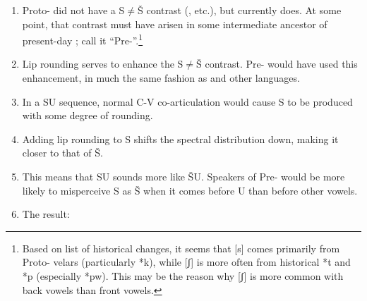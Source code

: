 \documentclass[output=paper,newtxmath,modfonts,nonflat,hidelinks]{langsci/langscibook}
\begin{document}
\begin{enumerate}
\item 
Proto- did not have a S${\neq}$Š contrast (\citealt{Meinhof1932,Hyman:2003a}, etc.), but  currently does. At some point, that contrast must have arisen in some intermediate ancestor of present-day ; call it ``Pre-''.\footnote{Based on  list of historical changes, it seems that [s] comes primarily from Proto- velars (particularly *k), while [ʃ] is more often from historical *t and *p (especially *pw). This may be the reason why [ʃ] is more common with back vowels than front vowels.}

\item Lip rounding serves to enhance the S${\neq}$Š contrast. Pre- would have used this enhancement, in much the same fashion as  and other languages.

\item In a SU sequence, normal C-V co-articulation would cause S to be produced with some degree of rounding.

\item Adding lip rounding to S shifts the spectral distribution down, making it closer to that of Š.

\item This means that SU sounds more like ŠU. Speakers of Pre- would be more likely to misperceive S as Š when it comes before U than before other vowels.

\item The result: 


\end{enumerate}
\end{document}
